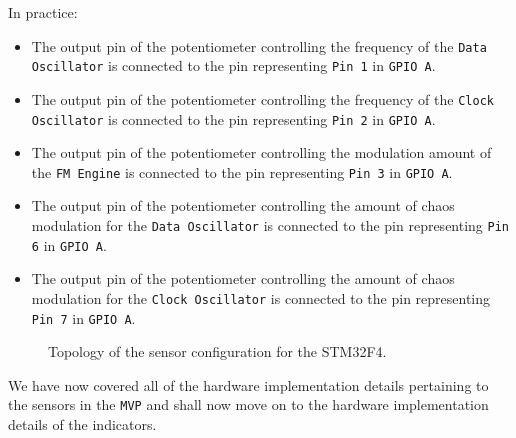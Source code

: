 \documentclass[12pt]{article}
\begin{document}
In practice:
\begin{itemize}
    \item The output pin of the potentiometer controlling the frequency of the \texttt{Data Oscillator} is connected to the pin representing \texttt{Pin 1} in \texttt{GPIO A}.
    
    \item The output pin of the potentiometer controlling the frequency of the \texttt{Clock Oscillator} is connected to the pin representing \texttt{Pin 2} in \texttt{GPIO A}.

    \item The output pin of the potentiometer controlling the modulation amount of the \texttt{FM Engine} is connected to the pin representing \texttt{Pin 3} in \texttt{GPIO A}.
    
    \item The output pin of the potentiometer controlling the amount of chaos modulation for the \texttt{Data Oscillator} is connected to the pin representing \texttt{Pin 6} in \texttt{GPIO A}.

     \item The output pin of the potentiometer controlling the amount of chaos modulation for the \texttt{Clock Oscillator} is connected to the pin representing \texttt{Pin 7} in \texttt{GPIO A}.
\end{itemize}

\begin{figure}[ht]
    \centering
    \caption{Topology of the sensor configuration for the STM32F4.}
    \label{fig:pot}
\end{figure}

We have now covered all of the hardware implementation details pertaining to the sensors in the \texttt{MVP} and shall now move on to the hardware implementation details of the indicators. 
\end{document}

